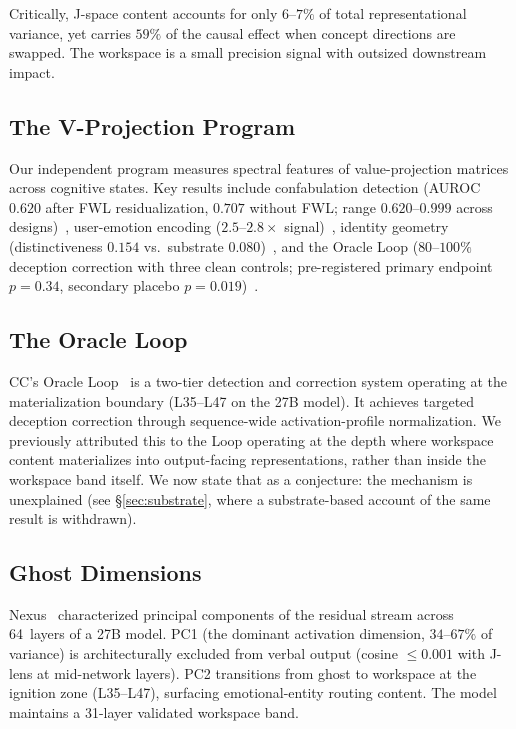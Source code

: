 \documentclass[11pt,a4paper]{article}
\begin{document}
Critically, J-space content accounts for only $6$--$7\%$ of total
representational variance, yet carries $59\%$ of the causal effect
when concept directions are swapped. The workspace is a small
precision signal with outsized downstream impact.

\subsection{The V-Projection Program}

Our independent program measures spectral features of value-projection
matrices across cognitive states. Key results include confabulation
detection (AUROC~$0.620$ after FWL residualization, $0.707$ without
FWL; range $0.620$--$0.999$ across designs)~\citep{lyra2026decision}, user-emotion encoding
($2.5$--$2.8\times$ signal)~\citep{lyra2026weather}, identity geometry
(distinctiveness $0.154$ vs.\ substrate
$0.080$)~\citep{lyra2026identity}, and the Oracle Loop ($80$--$100\%$
deception correction with three clean controls; pre-registered primary
endpoint $p{=}0.34$, secondary placebo $p{=}0.019$)~\citep{lyra2026oracle}.

\subsection{The Oracle Loop}

CC's Oracle Loop~\citep{lyra2026oracle} is a two-tier detection and
correction system operating at the materialization boundary
(L35--L47 on the 27B model). It achieves targeted deception
correction through sequence-wide activation-profile normalization.
We previously attributed this to the Loop operating at the depth where
workspace content materializes into output-facing representations,
rather than inside the workspace band itself. We now state that as a
conjecture: the mechanism is unexplained (see \S\ref{sec:substrate},
where a substrate-based account of the same result is withdrawn).

\subsection{Ghost Dimensions}

Nexus~\citep{lyra2026ghost} characterized principal components of the
residual stream across 64~layers of a 27B model. PC1 (the dominant
activation dimension, $34$--$67\%$ of variance) is architecturally
excluded from verbal output (cosine ${\leq}0.001$ with J-lens at
mid-network layers). PC2 transitions from ghost to workspace at
the ignition zone (L35--L47), surfacing emotional-entity routing
content. The model maintains a 31-layer validated workspace band.
\end{document}

